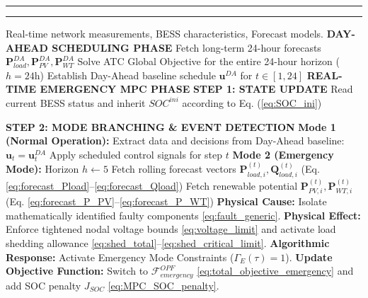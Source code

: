 \par\vspace{1em}
\noindent\rule{\linewidth}{0.8pt}
\label{alg:MPC_Emergency}
\vspace{-0.7em}\noindent\rule{\linewidth}{0.4pt}
\begin{algorithmic}[1]
\Require Real-time network measurements, BESS characteristics, Forecast models.
\State \textbf{DAY-AHEAD SCHEDULING PHASE}
\State Fetch long-term 24-hour forecasts $\mathbf{P}_{load}^{DA}, \mathbf{P}_{PV}^{DA}, \mathbf{P}_{WT}^{DA}$
\State Solve ATC Global Objective for the entire 24-hour horizon ($h=24\text{h}$)
\State Establish Day-Ahead baseline schedule $\mathbf{u}^{DA}$ for $t \in [1, 24]$
\State \textbf{REAL-TIME EMERGENCY MPC PHASE}
    \State \textbf{STEP 1: STATE UPDATE}
    \State Read current BESS status and inherit $SOC^{ini}$ according to Eq. (\ref{eq:SOC_ini})
    
    \State \textbf{STEP 2: MODE BRANCHING \& EVENT DETECTION}
        \State \textbf{Mode 1 (Normal Operation):}
        \State Extract data and decisions from Day-Ahead baseline: $\mathbf{u}_t = \mathbf{u}_t^{DA}$
        \State Apply scheduled control signals for step $t$
        \State \textbf{Mode 2 (Emergency Mode):}
        \State Horizon $h \gets 5$ 
        \State Fetch rolling forecast vectors $\mathbf{P}_{load,i}^{(t)}, \mathbf{Q}_{load,i}^{(t)}$ (Eq. \ref{eq:forecast_Pload}--\ref{eq:forecast_Qload}) 
        \State Fetch renewable potential $\mathbf{P}_{PV,i}^{(t)}, \mathbf{P}_{WT,i}^{(t)}$ (Eq. \ref{eq:forecast_P_PV}--\ref{eq:forecast_P_WT})
        \State \textbf{Physical Cause:} Isolate mathematically identified faulty components \eqref{eq:fault_generic}.
        \State \textbf{Physical Effect:} Enforce tightened nodal voltage bounds \eqref{eq:voltage_limit} 
        \Statex \hspace{2.6cm} and activate load shedding allowance \eqref{eq:shed_total}--\eqref{eq:shed_critical_limit}.
        \State \textbf{Algorithmic Response:} Activate Emergency Mode Constraints ($\Gamma_E(\tau) = 1$).
        \State \textbf{Update Objective Function:} Switch to $\mathcal{F}_{emergency}^{OPF}$ \eqref{eq:total_objective_emergency} 
        \Statex \hspace{4.2cm} and add SOC penalty $J_{SOC}$ \eqref{eq:MPC_SOC_penalty}.
        

\end{algorithmic}
